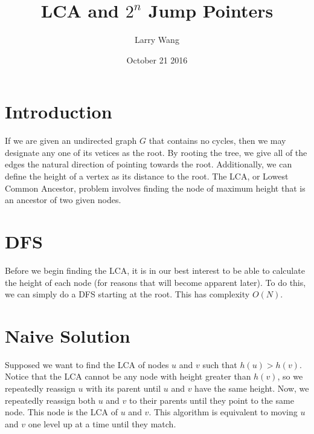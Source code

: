 \documentclass{article}
\title{LCA and $2^n$ Jump Pointers}
\author{Larry Wang }
\date{October 21 2016}
\begin{document}
\maketitle

\section{Introduction}
If we are given an undirected graph $G$ that contains no cycles, then we may designate any one of its vetices as the root. By rooting the tree, we give all of the edges the natural direction of pointing towards the root. Additionally, we can define the height of a vertex as its distance to the root. The LCA, or Lowest Common Ancestor, problem involves finding the node of maximum height that is an ancestor of two given nodes. 

\begin{figure}[H]
\centering
{}
\end{figure}


\section{DFS}

Before we begin finding the LCA, it is in our best interest to be able to calculate the height of each node (for reasons that will become apparent later). To do this, we can simply do a DFS starting at the root. This has complexity $O(N)$. 


\section {Naive Solution}

Supposed we want to find the LCA of nodes $u$ and $v$ such that $h(u)>h(v)$. Notice that the LCA cannot be any node with height greater than $h(v)$, so we repeatedly reassign $u$ with its parent until $u$ and $v$ have the same height. Now, we repeatedly reassign both $u$ and $v$ to their parents until they point to the same node. This node is the LCA of $u$ and $v$. This algorithm is equivalent to moving $u$ and $v$ one level up at a time until they match.
\end{document}
